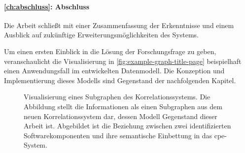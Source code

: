 \paragraph{\autoref{ch:abschluss}: Abschluss}
Die Arbeit schließt mit einer Zusammenfassung der Erkenntnisse und einem Ausblick auf zukünftige Erweiterungsmöglichkeiten des Systems.

\bigskip

Um einen ersten Einblick in die Lösung der Forschungsfrage zu geben, veranschaulicht die Visualisierung in \autoref{fig:example-graph-title-page} beispielhaft einen Anwendungsfall im entwickelten Datenmodell.
Die Konzeption und Implementierung dieses Modells sind Gegenstand der nachfolgenden Kapitel.

\clearpage
\thispagestyle{empty}
\vspace*{\fill}
\begin{figure}[h!]
    \centering
    \makebox[\textwidth]{}
    \caption[Beispiel eines Subgraphen des Korrelationssystems]{Visualisierung eines Subgraphen des Korrelationssystems. Die Abbildung stellt die Informationen als einen Subgraphen aus dem neuen Korrelationssystem dar, dessen Modell Gegenstand dieser Arbeit ist. Abgebildet ist die Beziehung zwischen zwei identifizierten Softwarekomponenten und ihre semantische Einbettung in das \acrshort{cpe}-System.}
    \label{fig:example-graph-title-page}
\end{figure}
\vspace*{\fill}
\clearpage
